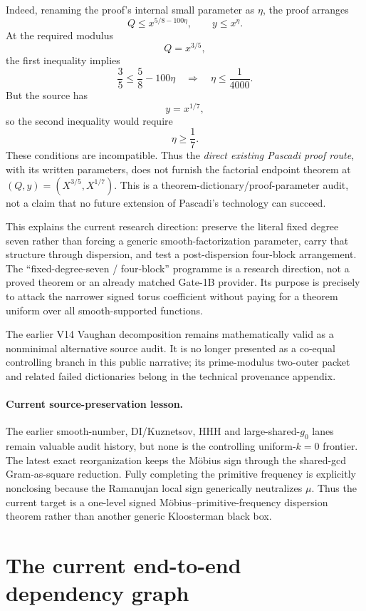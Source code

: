 \documentclass[11pt]{article}
\theoremstyle{definition}
\newcommand{\1}{\mathbf 1}
\begin{document}
Indeed, renaming the proof's internal small parameter as $\eta$, the proof arranges
\[
Q\le x^{5/8-100\eta},\qquad y\le x^\eta.
\]
At the required modulus
\[
Q=x^{3/5},
\]
the first inequality implies
\[
\frac35\le\frac58-100\eta
\quad\Longrightarrow\quad
\boxed{\eta\le\frac1{4000}}.
\]
But the source has
\[
y=x^{1/7},
\]
so the second inequality would require
\[
\boxed{\eta\ge\frac17}.
\]
These conditions are incompatible.  Thus the \emph{direct existing Pascadi proof route},
with its written parameters, does not furnish the factorial endpoint theorem at
$(Q,y)=(X^{3/5},X^{1/7})$.  This is a theorem-dictionary/proof-parameter audit, not a
claim that no future extension of Pascadi's technology can succeed.

This explains the current research direction: preserve the literal fixed degree seven rather than forcing a
generic smooth-factorization parameter, carry that structure through dispersion, and test a post-dispersion
four-block arrangement.  The ``fixed-degree-seven / four-block'' programme is a research direction, not a
proved theorem or an already matched Gate-1B provider.  Its purpose is precisely to attack the narrower signed
torus coefficient without paying for a theorem uniform over all smooth-supported functions.

The earlier V14 Vaughan decomposition remains mathematically valid as a nonminimal
alternative source audit.  It is no longer presented as a co-equal controlling branch in
this public narrative; its prime-modulus two-outer packet and related failed dictionaries
belong in the technical provenance appendix.

\paragraph{Current source-preservation lesson.}
The earlier smooth-number, DI/Kuznetsov, HHH and large-shared-$g_0$ lanes remain valuable
audit history, but none is the controlling uniform-$k=0$ frontier.  The latest exact
reorganization keeps the M\"obius sign through the shared-gcd Gram-as-square reduction.
Fully completing the primitive frequency is explicitly nonclosing because the Ramanujan
local sign generically neutralizes $\mu$.  Thus the current target is a one-level signed
M\"obius--primitive-frequency dispersion theorem rather than another generic Kloosterman
black box.


\section{The current end-to-end dependency graph}
\end{document}
